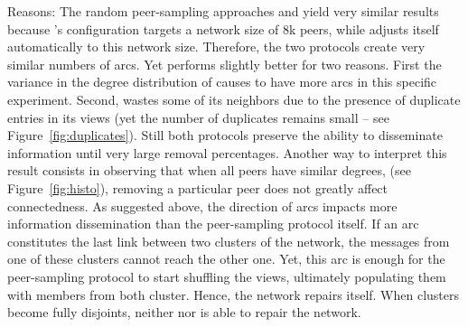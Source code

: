 \begin{asparadesc}
\item[Reasons:] The random peer-sampling approaches \CYCLON and \SPRAY yield
  very similar results because \CYCLON's configuration targets a network size of
  8k peers, while \SPRAY adjusts itself automatically to this network size.
  Therefore, the two protocols create very similar numbers of arcs. Yet \CYCLON
  performs slightly better for two reasons. First the variance in the degree
  distribution of \SPRAY causes \CYCLON to have more arcs in this specific
  experiment. Second, \SPRAY wastes some of its neighbors due to the presence of
  duplicate entries in its views (yet the number of duplicates remains small --
  see Figure~\ref{fig:duplicates}). Still both protocols preserve the ability to
  disseminate information until very large removal percentages. Another way to
  interpret this result consists in observing that when all peers have similar
  degrees, (see Figure~\ref{fig:histo}), removing a particular peer does not
  greatly affect connectedness. As suggested above, the direction of arcs
  impacts more information dissemination than the peer-sampling protocol
  itself. If an arc constitutes the last link between two clusters of the
  network, the messages from one of these clusters cannot reach the other
  one. Yet, this arc is enough for the peer-sampling protocol to start shuffling
  the views, ultimately populating them with members from both cluster. Hence,
  the network repairs itself.  When clusters become fully disjoints, neither
  \CYCLON nor \SPRAY is able to repair the
  network.  %
\end{asparadesc}



